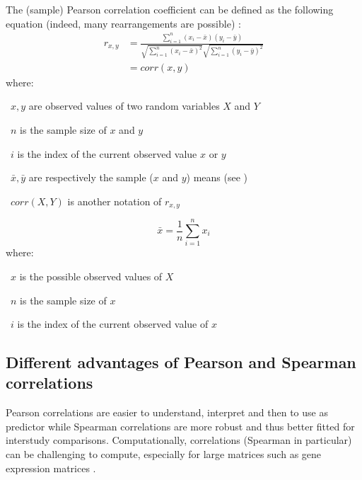 The (sample) Pearson correlation coefficient can be defined
as the following equation
(indeed, many rearrangements are possible) :
\begin{equation}\label{eq:PearsonCor}
    \tag{(Sample) Pearson correlation coefficient}
    \begin{split}
        r_{x,y} & = \frac{\sum ^n _{i=1}(x_i - \bar{x})(y_i - \bar{y})}{\sqrt{\sum ^n _{i=1}(x_i - \bar{x})^2}
        \sqrt{\sum ^n _{i=1}(y_i - \bar{y})^2}} \\
                & = corr(x,y)
    \end{split}
\end{equation}
where:
\quad\begin{eqlist}
    \item[\textbullet\ $x,y$] are observed values of two random variables $X$ and $Y$
    \item[\textbullet\ $n$] is the sample size of $x$ and $y$
    \item[\textbullet\ $i$] is the index of the current observed value $x$ or $y$
    \item[\textbullet\ $\bar{x}, \bar{y}$] are respectively the sample ($x$ and $y$) means (see )
    \item[\textbullet\ $corr(X,Y)$] is another notation of $r_{x,y}$
\end{eqlist}

\begin{equation}\label{eq:mean}
    \tag{Mean}
    \bar{x}=\frac{1}{n}\sum_{i=1}^n x_i
\end{equation}
where:
\quad\begin{eqlist}
    \item[\textbullet\ $x$] is the possible observed values of $X$
    \item[\textbullet\ $n$] is the sample size of $x$
    \item[\textbullet\ $i$] is the index of the current observed value of $x$
\end{eqlist}


\subsection{Different advantages of Pearson and Spearman correlations}\label{subsec:PearsonVsSpearman}

Pearson correlations are easier to understand, interpret and then to use as predictor
while Spearman correlations are more robust and thus better fitted for interstudy
comparisons.
Computationally, correlations (Spearman in particular) can be challenging to compute,
especially for large matrices such as gene expression matrices .

